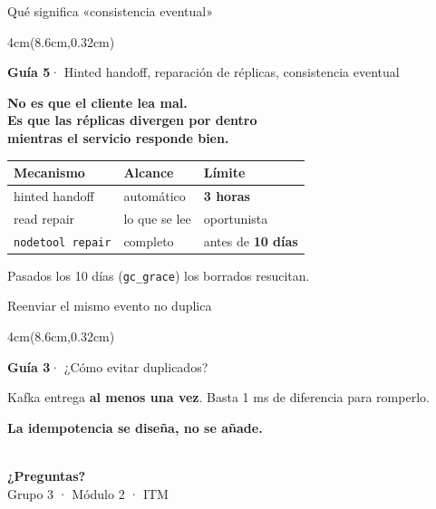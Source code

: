 \documentclass[aspectratio=169,11pt]{beamer}
\newcommand{\quien}[1]{%
  \begin{textblock*}{4cm}(8.6cm,0.32cm)
    \tiny\textcolor{white}{\textbf{#1}}
  \end{textblock*}}
\newcommand{\remate}[1]{%
  \vfill
  \begin{center}
  \begin{minipage}{0.88\textwidth}\centering
  \large\textcolor{cmVerde!65!black}{\textbf{#1}}
  \end{minipage}
  \end{center}
  \vspace{6pt}}
\newcommand{\guia}[2]{%
  \vspace{-5pt}
  \begingroup\scriptsize\raggedright
  \textcolor{cmVerde}{\textbf{Guía #1}}\;\textcolor{cmGris}{· #2}\par
  \endgroup
  \vspace{10pt}}
\begin{document}
\begin{frame}{Qué significa «consistencia eventual»}
\quien{Nilton}
\guia{5}{Hinted handoff, reparación de réplicas, consistencia eventual}
\vspace{10pt}
\centering
\begin{minipage}{0.86\textwidth}\centering
{\large\textcolor{cmAzul}{\textbf{No es que el cliente lea mal.}}}\\[8pt]
{\large\textcolor{cmVerde!65!black}{\textbf{Es que las réplicas divergen por dentro\\
mientras el servicio responde bien.}}}
\end{minipage}

\vspace{16pt}
\small
\begin{tabular}{@{}lll@{}}
\toprule
\textbf{Mecanismo} & \textbf{Alcance} & \textbf{Límite} \\
\midrule
hinted handoff & automático & \textbf{3 horas} \\
read repair & lo que se lee & oportunista \\
\texttt{nodetool repair} & \textcolor{cmVerde!65!black}{completo} & antes de \textbf{10 días} \\
\bottomrule
\end{tabular}

\vspace{10pt}
{\footnotesize\textcolor{cmGris}{Pasados los 10 días (\texttt{gc\_grace}) los borrados resucitan.}}
\end{frame}

\begin{frame}{Reenviar el mismo evento no duplica}
\quien{Nilton}
\guia{3}{¿Cómo evitar duplicados?}
\vspace{8pt}
\centering
{}

\vspace{12pt}
{\small\textcolor{cmGris}{Kafka entrega \textbf{al menos una vez}. Basta 1 ms de diferencia
para romperlo.}}

\remate{La idempotencia se diseña, no se añade.}
\end{frame}

\begin{frame}[plain]\centering\vfill
{\logomarca[2.2]}\\[12pt]
{\Large\textcolor{cmAzul}{\textbf{¿Preguntas?}}}\\[10pt]
{\footnotesize\textcolor{cmGris}{Grupo 3 · Módulo 2 · ITM}}
\vfill\end{frame}
\end{document}
